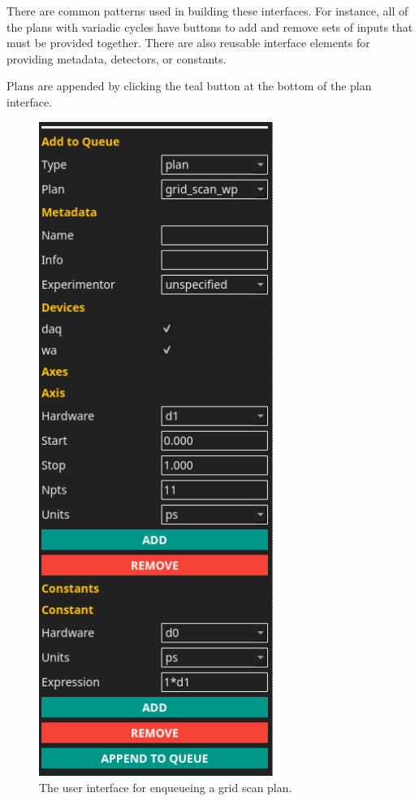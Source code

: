There are common patterns used in building these interfaces.
For instance, all of the plans with variadic cycles have buttons to add and remove sets of inputs that must be provided together.
There are also reusable interface elements for providing metadata, detectors, or constants.

Plans are appended by clicking the teal button at the bottom of the plan interface.

\begin{figure}
\includegraphics[width=3in]{"acquisition/images/grid_scan"}
\caption[Example Plan Enqueuing UI]{
	The user interface for enqueueing a grid scan plan.
}
\label{acq:fig:grid_scan}
\end{figure}

